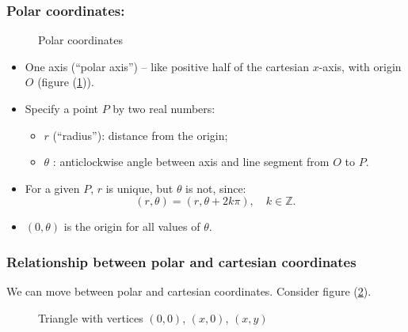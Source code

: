  \subsubsection*{Polar coordinates:}

  \begin{figure}[H]
    \centering
    \def\svgwidth{0.29\columnwidth}
    
    \caption{Polar coordinates}
    \label{polar}
  \end{figure}

  \begin{itemize}
    \item One axis (``polar axis'') -- like positive half of the cartesian $x$-axis, with origin $O$ (figure (\ref{polar})).
    \item Specify a point $P$ by two real numbers:
      \begin{itemize}
        \item $r$ (``radius''): distance from the origin;
        \item $\theta$ : anticlockwise angle between axis and line segment from $O$ to $P$.
      \end{itemize}
    \item For a given $P$, $r$ is unique, but $\theta$ is not, since:
      \[
        (r, \theta) = (r, \theta + 2k\pi), \quad k \in \mathbb{Z}.
      \]
    \item $(0, \theta)$ is the origin for all values of $\theta$.
  \end{itemize}

  \subsubsection*{Relationship between polar and cartesian coordinates}

  We can move between polar and cartesian coordinates.  Consider figure (\ref{polarcartesian}).
  \begin{figure}[H]
    \centering
    \def\svgwidth{0.29\columnwidth}
    
    \caption{Triangle with vertices $(0, 0)$, $(x, 0)$, $(x, y)$}
    \label{polarcartesian}
  \end{figure}


